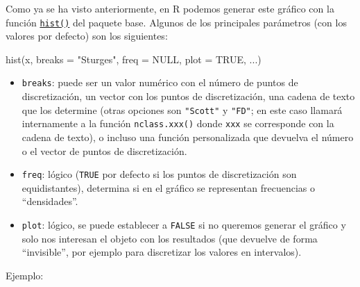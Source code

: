 \documentclass[
  10pt,
]{book}
\newenvironment{Shaded}{\begin{snugshade}}{\end{snugshade}}
\newcommand{\AttributeTok}[1]{\textcolor[rgb]{0.77,0.63,0.00}{#1}}
\newcommand{\ConstantTok}[1]{\textcolor[rgb]{0.00,0.00,0.00}{#1}}
\newcommand{\FunctionTok}[1]{\textcolor[rgb]{0.00,0.00,0.00}{#1}}
\newcommand{\NormalTok}[1]{#1}
\newcommand{\StringTok}[1]{\textcolor[rgb]{0.31,0.60,0.02}{#1}}
\theoremstyle{break}
\theoremstyle{nonumberplain}
\begin{document}
Como ya se ha visto anteriormente, en R podemos generar este gráfico con la función \href{https://rdrr.io/r/graphics/hist.html}{\texttt{hist()}} del paquete base.
Algunos de los principales parámetros (con los valores por defecto) son los siguientes:

\begin{Shaded}
\begin{Highlighting}[]
\FunctionTok{hist}\NormalTok{(x, }\AttributeTok{breaks =} \StringTok{"Sturges"}\NormalTok{, }\AttributeTok{freq =} \ConstantTok{NULL}\NormalTok{, }\AttributeTok{plot =} \ConstantTok{TRUE}\NormalTok{, ...)}
\end{Highlighting}
\end{Shaded}

\begin{itemize}
\item
  \texttt{breaks}: puede ser un valor numérico con el número de puntos de discretización, un vector con los puntos de discretización, una cadena de texto que los determine (otras opciones son \texttt{"Scott"} y \texttt{"FD"}; en este caso llamará internamente a la función \texttt{nclass.xxx()} donde \texttt{xxx} se corresponde con la cadena de texto), o incluso una función personalizada que devuelva el número o el vector de puntos de discretización.
\item
  \texttt{freq}: lógico (\texttt{TRUE} por defecto si los puntos de discretización son equidistantes), determina si en el gráfico se representan frecuencias o ``densidades''.
\item
  \texttt{plot}: lógico, se puede establecer a \texttt{FALSE} si no queremos generar el gráfico y solo nos interesan el objeto con los resultados (que devuelve de forma ``invisible'', por ejemplo para discretizar los valores en intervalos).
\end{itemize}

Ejemplo:
\end{document}
